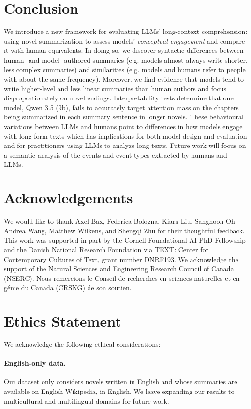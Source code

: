 \documentclass{article} %
\begin{document}
\section{Conclusion}
We introduce a new framework for evaluating LLMs' long-context comprehension: using novel summarization to assess models' \textit{conceptual engagement} and compare it with human equivalents.
In doing so, we discover syntactic differences between human- and model- authored summaries (e.g. models almost always write shorter, less complex summaries) and similarities (e.g. models and humans refer to people with about the same frequency).
Moreover, we find evidence that models tend to write higher-level and less linear summaries than human authors and focus disproportionately on novel endings.
Interpretability tests determine that one model, Qwen 3.5 (9b), fails to accurately target attention mass on the chapters being summarized in each summary sentence in longer novels.
These behavioural variations between LLMs and humans point to differences in how models engage with long-form texts which has implications for both model design and evaluation and for practitioners using LLMs to analyze long texts.
Future work will focus on a semantic analysis of the events and event types extracted by humans and LLMs.

\section*{Acknowledgements}
We would like to thank Axel Bax, Federica Bologna, Kiara Liu, Sanghoon Oh, Andrea Wang, Matthew Wilkens, and Shengqi Zhu for their thoughtful feedback.
This work was supported in part by the Cornell Foundational AI PhD Fellowship and the Danish National Research Foundation via TEXT: Center for Contemporary Cultures of Text, grant number DNRF193.
We acknowledge the support of the Natural Sciences and Engineering Research Council of Canada (NSERC). Nous remercions le Conseil de recherches en sciences naturelles et en génie du Canada (CRSNG) de son soutien.

\section*{Ethics Statement}
We acknowledge the following ethical considerations:

\paragraph{English-only data.}
Our dataset only considers novels written in English and whose summaries are available on English Wikipedia, in English.
We leave expanding our results to multicultural and multilingual domains for future work.
\end{document}
